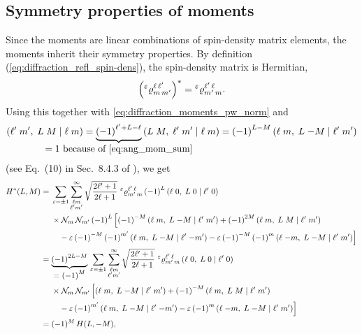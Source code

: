 \subsection{Symmetry properties of moments}%
\label{sec:diffraction:moments_sym}

Since the moments are linear combinations of spin-density matrix
elements, the moments inherit their symmetry properties.  By
definition (\confer \cref{eq:diffraction_refl_spin-dens}), the
spin-density matrix is Hermitian, \ie
\begin{equation}
  \rBrk{\prescript{\refl}{}{\varrho}^{\ell\, \ell'}_{m\, m'}}^*
  = \prescript{\refl}{}{\varrho}^{\ell'\, \ell}_{m'\, m}.
\end{equation}
Using this together with \cref{eq:diffraction_moments_pw_norm} and
\begin{equation}
  \label{eq:clebsch_sym}
  \clebsch{\ell'}{m'}{L}{M}{\ell}{m}
  = \cdUnderbrace{{(-1)}^{\ell' + L - \ell}}{= 1~\text{because of \cref{eq:ang_mom_sum}}}\, \clebsch{L}{M}{\ell'}{m'}{\ell}{m}
  = {(-1)}^{L - M}\, \clebsch{\ell}{m}{L}{-M}{\ell'}{m'}
\end{equation}
(see Eq.~(10) in Sec.~8.4.3 of ), we get
\begin{align}
  H^*(L, M)
  ={}& \begin{multlined}[t][0.8\textwidth]
    \sum_{\refl = \pm 1} \sum_{\substack{\ell m \\ \ell' m'}}^\infty
    \sqrt{\frac{2 \ell' + 1}{2 \ell + 1}}\,
    \prescript{\refl}{}{\varrho}^{\ell'\, \ell}_{m'\, m}\, {(-1)}^L\, \clebsch{\ell}{0}{L}{0}{\ell'}{0} \\
    \shoveleft{\times \mathcal{N}_m\, \mathcal{N}_{m'}\, {(-1)}^L\, \Big[
      {(-1)}^{-M}\, \clebsch{\ell}{m}{L}{-M}{\ell'}{m'}
      + {(-1)}^{2M}\, \clebsch{\ell}{m}{L}{M}{\ell'}{m'}} \\
      - \refl\, {(-1)}^{-M}\, {(-1)}^{m'}\, \clebsch{\ell}{m}{L}{-M}{\ell'}{-m'}
      - \refl\, {(-1)}^{-M}\, {(-1)}^m\, \clebsch{\ell}{-m}{L}{-M}{\ell'}{m'} \Big]
  \end{multlined} \notag
  \\
  ={}& \begin{multlined}[t][0.8\textwidth]
    \dUnderbrace{{(-1)}^{2 L - M}}{= {(-1)}^M}\, \sum_{\refl = \pm 1} \sum_{\substack{\ell m \\ \ell' m'}}^\infty
    \sqrt{\frac{2 \ell' + 1}{2 \ell + 1}}\,
    \prescript{\refl}{}{\varrho}^{\ell'\, \ell}_{m'\, m}\, \clebsch{\ell}{0}{L}{0}{\ell'}{0} \\
    \shoveleft{\times \mathcal{N}_m\, \mathcal{N}_{m'}\, \Big[
      \clebsch{\ell}{m}{L}{-M}{\ell'}{m'}
      + {(-1)}^{-M}\, \clebsch{\ell}{m}{L}{M}{\ell'}{m'}} \\
      - \refl\, {(-1)}^{m'}\, \clebsch{\ell}{m}{L}{-M}{\ell'}{-m'}
      - \refl\, {(-1)}^m\, \clebsch{\ell}{-m}{L}{-M}{\ell'}{m'} \Big]
  \end{multlined} \notag
  \\
  \label{eq:diffraction_moment_sym_1}
  ={}& (-1)^M\, H(L, -M),
\end{align}
